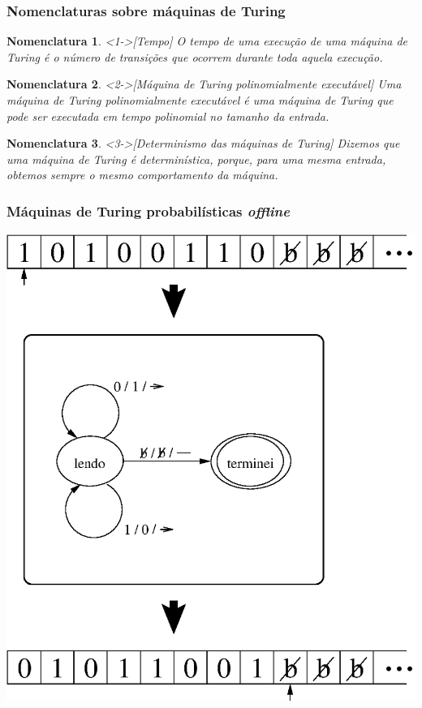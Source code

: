 \documentclass{beamer}
\theoremstyle{teoaxicorlem}
\theoremstyle{defnotnom}
\newtheorem{Nom}{Nomenclatura}
\begin{document}
\begin{frame}
  \frametitle{Nomenclaturas sobre máquinas de Turing}
  \small
  \begin{Nom}<1->[Tempo]
    O \alert{tempo} de uma execução de uma
    máquina de Turing é o número de transições que
    ocorrem durante toda aquela execução.
  \end{Nom}
  \vfill
  \begin{Nom}<2->[Máquina de Turing polinomialmente executável]
    Uma \alert{máquina de Turing polinomialmente executável} é uma
    máquina de Turing que pode ser executada em tempo polinomial no
    tamanho da entrada.
  \end{Nom}
  \vfill
  \begin{Nom}<3->[Determinismo das máquinas de Turing]
    Dizemos que uma máquina de Turing é \alert{determinística}, porque,
    para uma mesma entrada, obtemos sempre o mesmo comportamento da
    máquina.
  \end{Nom}
\end{frame}

\begin{frame}
  \frametitle{Máquinas de Turing probabilísticas \textit{offline}}
  \begin{center}
    \noindent
    \includegraphics[height=.85\textheight]{turing.eps}
  \end{center}
\end{frame}
\end{document}
